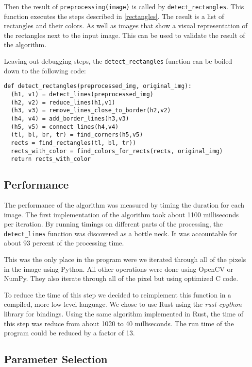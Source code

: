 Then the result of \texttt{preprocessing(image)} is called by
\texttt{detect\_rectangles}. This function executes the steps described in
\ref{rectangles}. The result is a list of rectangles and their colors. As
well as images that show a visual representation of the rectangles next to
the input image. This can be used to validate the result of the algorithm.

Leaving out debugging steps, the \texttt{detect\_rectangles} function can be
boiled down to the following code:

\begin{lstlisting}
def detect_rectangles(preprocessed_img, original_img):
  (h1, v1) = detect_lines(preprocessed_img)
  (h2, v2) = reduce_lines(h1,v1)
  (h3, v3) = remove_lines_close_to_border(h2,v2)
  (h4, v4) = add_border_lines(h3,v3)
  (h5, v5) = connect_lines(h4,v4)
  (tl, bl, br, tr) = find_corners(h5,v5)
  rects = find_rectangles(tl, bl, tr))
  rects_with_color = find_colors_for_rects(rects, original_img)
  return rects_with_color
\end{lstlisting}

\subsection{Performance}

The performance of the algorithm was measured by timing the duration for each
image. The first implementation of the algorithm took about 1100 milliseconds per
iteration. By running timings on different parts of the processing, the
\texttt{detect\_lines} function was discovered as a bottle neck. It was
accountable for about 93 percent of the processing time.

This was the only place in the program were we iterated through all of the pixels
in the image using Python. All other operations were done using OpenCV or NumPy.
They also iterate through all of the pixel but using optimized C code.

To reduce the time of this step we decided to reimplement this function in a
compiled, more low-level language. We chose to use Rust using the \textit{rust-cpython}
library for bindings. Using the same algorithm implemented in Rust, the time of
this step was reduce from about 1020 to 40 milliseconds. The run time of the
program could be reduced by a factor of 13.

\subsection{Parameter Selection} \label{parameter}

